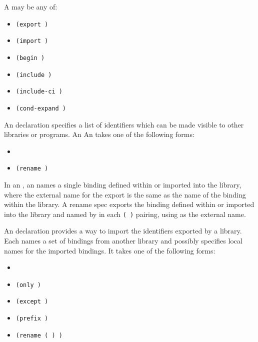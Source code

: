 A  may be any of:

\begin{itemize}

\item{\tt(export  \dotsfoo)}

\item{\tt(import  \dotsfoo)}

\item{\tt(begin  \dotsfoo)}

\item{\tt(include   \dotsfoo)}

\item{\tt(include-ci   \dotsfoo)}

\item{\tt(cond-expand  \dotsfoo)}

\end{itemize}

An  declaration specifies a list of identifiers which
can be made visible to other libraries or programs.  An
An  takes one of the following forms:

\begin{itemize}
\item{}
\item{\tt{(rename  )}}
\end{itemize}

In an , an  names a single
binding defined within or imported into the library, where the
external name for the export is the same as the name of the binding
within the library. A rename spec exports the binding 
defined within or imported into the library and named by
 in each
{\tt( )} pairing,
using  as the external name.

An  declaration provides a way to import the identifiers
exported by a library.  Each  names a set of bindings
from another library and possibly specifies local names for the
imported bindings. It takes one of the following forms:

\begin{itemize}
\item {\tt{}}
\item {\tt(only   \dotsfoo)}
\item {\tt(except   \dotsfoo)}
\item {\tt(prefix  )}
\item {\tt(rename  ( ) \dotsfoo)}
\end{itemize}

